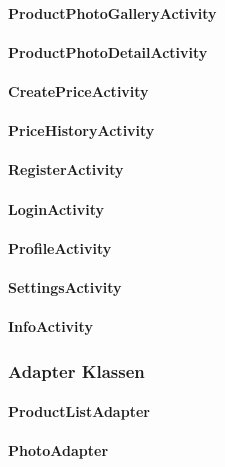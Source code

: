\documentclass{scrartcl}
\begin{document}
\paragraph{ProductPhotoGalleryActivity}

\paragraph{ProductPhotoDetailActivity}

\paragraph{CreatePriceActivity}

\paragraph{PriceHistoryActivity}

\paragraph{RegisterActivity}

\paragraph{LoginActivity}

\paragraph{ProfileActivity}

\paragraph{SettingsActivity}

\paragraph{InfoActivity}

\subsubsection{Adapter Klassen}

\paragraph{ProductListAdapter}

\paragraph{PhotoAdapter}
\end{document}
